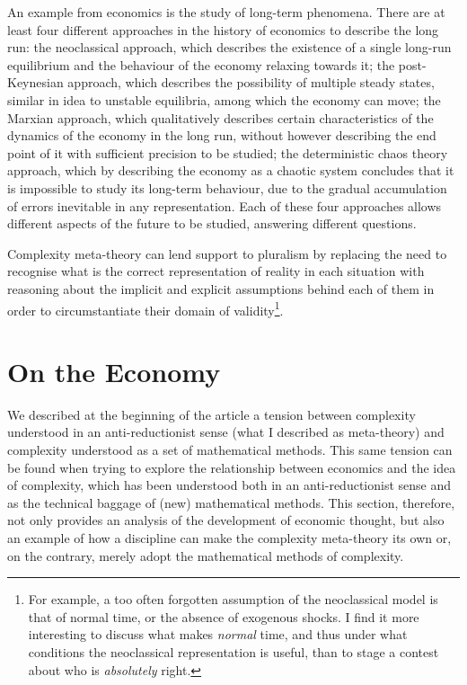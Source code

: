 An example from economics is the study of long-term phenomena.
There are at least four different approaches in the history of economics to describe the long run: the neoclassical approach, which describes the existence of a single long-run equilibrium and the behaviour of the economy relaxing towards it; the post-Keynesian approach, which describes the possibility of multiple steady states, similar in idea to unstable equilibria, among which the economy can move; the Marxian approach, which qualitatively describes certain characteristics of the dynamics of the economy in the long run, without however describing the end point of it with sufficient precision to be studied; the deterministic chaos theory approach, which by describing the economy as a chaotic system concludes that it is impossible to study its long-term behaviour, due to the gradual accumulation of errors inevitable in any representation.
Each of these four approaches allows different aspects of the future to be studied, answering different questions.

Complexity meta-theory can lend support to pluralism by replacing the need to recognise what is the correct representation of reality in each situation with reasoning about the implicit and explicit assumptions behind each of them in order to circumstantiate their domain of validity\footnote{For example, a too often forgotten assumption of the neoclassical model is that of normal time, or the absence of exogenous shocks. I find it more interesting to discuss what makes \textit{normal} time, and thus under what conditions the neoclassical representation is useful, than to stage a contest about who is \textit{absolutely} right.}.

\section{On the Economy}
We described at the beginning of the article a tension between complexity understood in an anti-reductionist sense (what I described as meta-theory) and complexity understood as a set of mathematical methods.
This same tension can be found when trying to explore the relationship between economics and the idea of complexity, which has been understood both in an anti-reductionist sense and as the technical baggage of (new) mathematical methods.
This section, therefore, not only provides an analysis of the development of economic thought, but also an example of how a discipline can make the complexity meta-theory its own or, on the contrary, merely adopt the mathematical methods of complexity.

